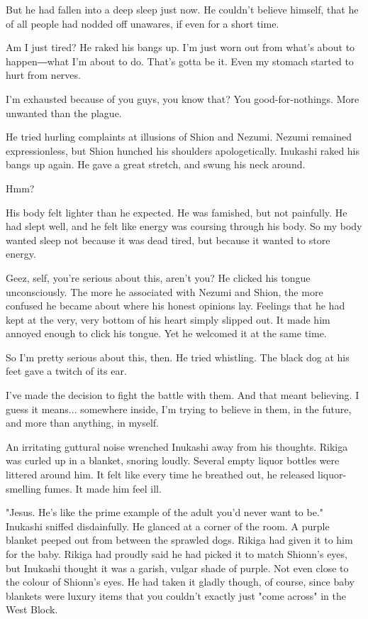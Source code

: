 But he had fallen into a deep sleep just now. He couldn't believe
himself, that he of all people had nodded off unawares, if even for a
short time.

Am I just tired? He raked his bangs up. I'm just worn out from what's
about to happen―what I'm about to do. That's gotta be it. Even my
stomach started to hurt from nerves.

I'm exhausted because of you guys, you know that? You good-for-nothings.
More unwanted than the plague.

He tried hurling complaints at illusions of Shion and Nezumi. Nezumi
remained expressionless, but Shion hunched his shoulders apologetically.
Inukashi raked his bangs up again. He gave a great stretch, and swung
his neck around.

Hmm?

His body felt lighter than he expected. He was famished, but not
painfully. He had slept well, and he felt like energy was coursing
through his body. So my body wanted sleep not because it was dead tired,
but because it wanted to store energy.

Geez, self, you're serious about this, aren't you? He clicked his tongue
unconsciously. The more he associated with Nezumi and Shion, the more
confused he became about where his honest opinions lay. Feelings that he
had kept at the very, very bottom of his heart simply slipped out. It
made him annoyed enough to click his tongue. Yet he welcomed it at the
same time.

So I'm pretty serious about this, then. He tried whistling. The black
dog at his feet gave a twitch of its ear.

I've made the decision to fight the battle with them. And that meant
believing. I guess it means... somewhere inside, I'm trying to believe
in them, in the future, and more than anything, in myself.

An irritating guttural noise wrenched Inukashi away from his thoughts.
Rikiga was curled up in a blanket, snoring loudly. Several empty liquor
bottles were littered around him. It felt like every time he breathed
out, he released liquor-smelling fumes. It made him feel ill.

"Jesus. He's like the prime example of the adult you'd never want to
be." Inukashi sniffed disdainfully. He glanced at a corner of the room.
A purple blanket peeped out from between the sprawled dogs. Rikiga had
given it to him for the baby. Rikiga had proudly said he had picked it
to match Shionn's eyes, but Inukashi thought it was a garish, vulgar
shade of purple. Not even close to the colour of Shionn's eyes. He had
taken it gladly though, of course, since baby blankets were luxury items
that you couldn't exactly just "come across" in the West Block.

